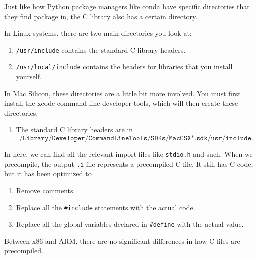 \documentclass{article}
\begin{document}
    Just like how Python package managers like conda have specific directories that they find package in, the C library also has a certain directory. 

    \begin{definition}
      In Linux systems, there are two main directories you look at: 
      \begin{enumerate}
        \item \texttt{/usr/include} contains the standard C library headers.
        \item \texttt{/usr/local/include} contains the headers for libraries that you install yourself.
      \end{enumerate}
      In Mac Silicon, these directories are a little bit more involved. You must first install the xcode command line developer tools, which will then create these directories. 
      \begin{enumerate}
        \item The standard C library headers are in 
          \begin{equation*}
            \texttt{/Library/Developer/CommandLineTools/SDKs/MacOSX*.sdk/usr/include}.
          \end{equation*}
      \end{enumerate}
    \end{definition}

    In here, we can find all the relevant import files like \texttt{stdio.h} and such. When we precompile, the output \texttt{.i} file represents a precompiled C file. It still has C code, but it has been optimized to 
    \begin{enumerate}
      \item Remove comments. 
      \item Replace all the \texttt{\#include} statements with the actual code. 
      \item Replace all the global variables declared in \texttt{\#define} with the actual value.
    \end{enumerate}
    Between x86 and ARM, there are no significant differences in how C files are precompiled. 
\end{document}
